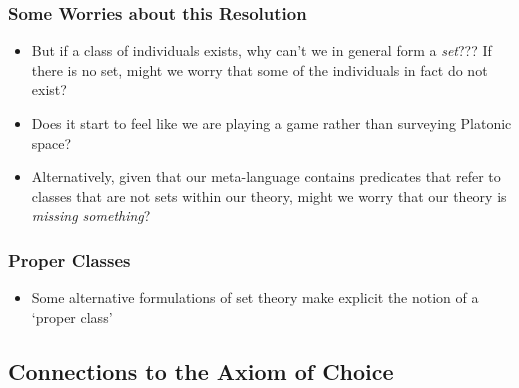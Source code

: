 \begin{frame}
\frametitle{Some Worries about this Resolution}

\begin{itemize}[<+->]

\item But if a class of individuals exists, why can't we in general form a \textit{set}??? If there is no set, might we worry that some of the individuals in fact do not exist?

\item Does it start to feel like we are playing a game rather than surveying Platonic space?

\item Alternatively, given that our meta-language contains predicates that refer to classes that are not sets within our theory, might we worry that our theory is \textit{missing something}?


\end{itemize}
\end{frame}

\begin{frame}
\frametitle{Proper Classes}

\begin{itemize}[<+->]

\item Some alternative formulations of set theory make explicit the notion of a `proper class'

\end{itemize}
\end{frame}


\subsection{\phantom{v} Connections to the Axiom of Choice}


